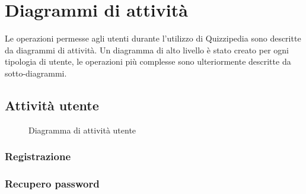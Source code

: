 \documentclass[a4paper, titlepage]{article}
\begin{document}
\section{Diagrammi di attività}
Le operazioni permesse agli utenti durante l’utilizzo di Quizzipedia sono descritte da diagrammi di attività. Un diagramma di alto livello è stato creato per ogni tipologia di utente, le operazioni più complesse sono ulteriormente descritte da sotto-diagrammi.

\subsection{Attività utente}
\begin{figure}[H]
	\centering
	\noindent{}
	\caption{Diagramma di attività utente}
\end{figure}


\subsubsection{Registrazione}

\subsubsection{Recupero password}
\end{document}
